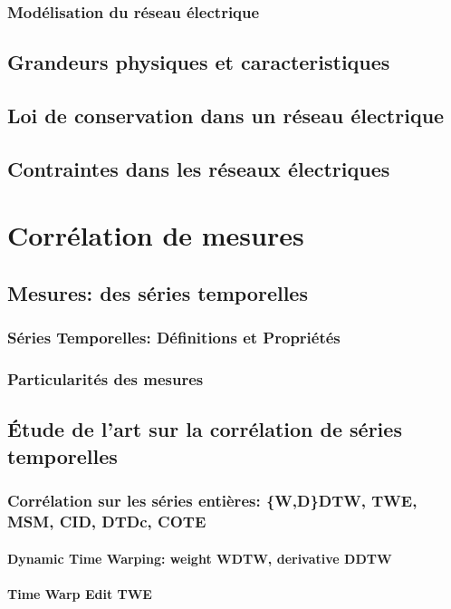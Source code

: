 		\subsection{Mod\'elisation du r\'eseau \'electrique}
	\section{Grandeurs physiques et caracteristiques}
	\section{Loi de conservation dans un r\'eseau \'electrique }
	\section{Contraintes dans les r\'eseaux \'electriques}
\chapter{Corr\'elation de mesures}
	\section{Mesures: des s\'eries temporelles}
		\subsection{S\'eries Temporelles: D\'efinitions et Propri\'et\'es}
		\subsection{Particularit\'es des mesures}
	\section{\'Etude de l'art sur la corr\'elation de s\'eries temporelles}
		\subsection{Corr\'elation sur les s\'eries enti\`eres: \{W,D\}DTW, TWE, MSM, CID, DTDc, COTE}
			\subsubsection{Dynamic Time Warping: weight WDTW, derivative DDTW }
			\subsubsection{Time Warp Edit TWE}
